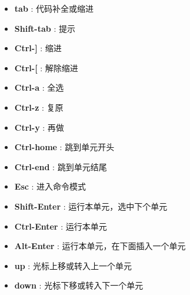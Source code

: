 \documentclass[11pt,UTF8,hyperref,openany]{ctexbook}
\begin{document}
\begin{itemize}
\item {\textbf{tab} : 代码补全或缩进}
\item {\textbf{Shift-tab} : 提示}
\item {\textbf{Ctrl-]} : 缩进}
\item {\textbf{Ctrl-[} : 解除缩进}
\item {\textbf{Ctrl-a} : 全选}
\item {\textbf{Ctrl-z} : 复原}
\item {\textbf{Ctrl-y} : 再做}
\item {\textbf{Ctrl-home} : 跳到单元开头}
\item {\textbf{Ctrl-end} : 跳到单元结尾}
\item {\textbf{Esc} : 进入命令模式}
\item {\textbf{Shift-Enter} : 运行本单元，选中下个单元}
\item {\textbf{Ctrl-Enter} : 运行本单元}
\item {\textbf{Alt-Enter} : 运行本单元，在下面插入一个单元}
\item {\textbf{up} : 光标上移或转入上一个单元}
\item {\textbf{down} : 光标下移或转入下一个单元}
\end{itemize}

\end{document}

